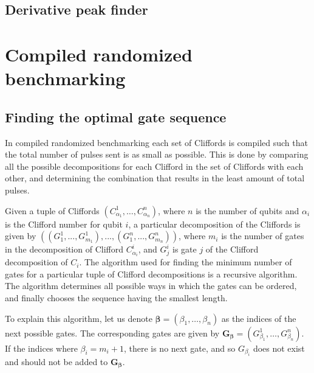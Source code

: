     \subsection{Derivative peak finder}
  \section{Compiled randomized benchmarking}
    \label{sec:compiled randomized benchmarking algorithm}
    \subsection{Finding the optimal gate sequence}
      In compiled randomized benchmarking each set of Cliffords is compiled such that the total number of pulses sent is as small as possible. This is done by comparing all the possible decompositions for each Clifford in the set of Cliffords with each other, and determining the combination that results in the least amount of total pulses.

      Given a tuple of Cliffords $\left(C_{\alpha_1}^1, \dots, C_{\alpha_n}^n\right)$, where $n$ is the number of qubits and $\alpha_i$ is the Clifford number for qubit $i$, a particular decomposition of the Cliffords is given by $\left(\left( G_1^1, ..., G_{m_1}^1 \right) , ..., \left(G_1^n, ..., G_{m_n}^n\right)\right)$, where $m_i$ is the number of gates in the decomposition of Clifford $C_{\alpha_i}^i$, and $G_j^i$ is gate $j$ of the Clifford decomposition of $C_i$. The algorithm used for finding the minimum number of gates for a particular tuple of Clifford decompositions is a recursive algorithm. The algorithm determines all possible ways in which the gates can be ordered, and finally chooses the sequence having the smallest length.

      To explain this algorithm, let us denote $\bm{\beta}=\left(\beta_1, \dots, \beta_n\right)$ as the indices of the next possible gates. The corresponding gates are given by $\bm{G_\bm{\beta}}=\left( G_{\beta_1}^1, \dots, G_{\beta_n}^n \right)$. If the indices where $\beta_i=m_i + 1$, there is no next gate, and so $G_{\beta_i}$ does not exist and should not be added to $\bm{G_\bm{\beta}}$.


